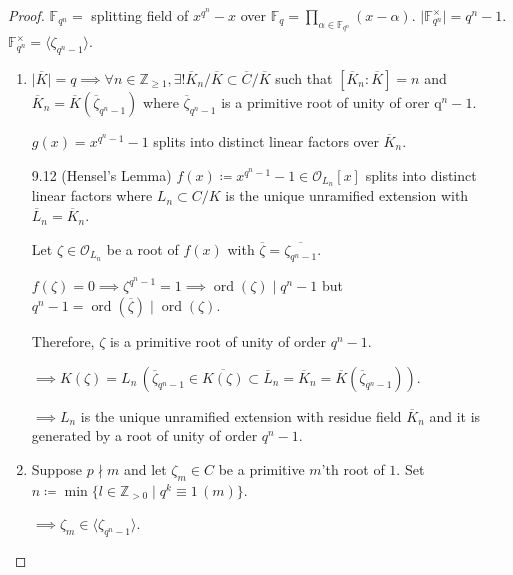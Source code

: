 \documentclass[openany]{amsbook}
\numberwithin{section}{chapter}
\theoremstyle{definition}
\begin{document}
\begin{proof}

    \(\mathbb{F}_{q^n} = \) splitting field of \(x^{q^n} - x\) over \(\mathbb{F}_q = \prod_{\alpha \in \mathbb{F}_{q^n}}(x-\alpha)\). \(\vert \mathbb{F}_{q^n}^\times \vert = q^n - 1\). \(\mathbb{F}_{q^n}^\times = \langle \zeta_{q^n - 1} \rangle\).   

    \begin{enumerate}[label=\roman*)]
        \item \(\vert \overline{K} \vert = q \implies \forall n\in\mathbb{Z}_{\geq 1}, \exists ! \overline{K}_n / \overline{K} \subset \overline{C} / \overline{K}\) such that \([\overline{K}_n : \overline{K}] = n\) and \(\overline{K}_n = \overline{K}(\overline{\zeta}_{q^n - 1})\) where \(\overline{\zeta}_{q^n - 1}\) is a primitive root of unity of orer q\(^n - 1\).
        
        \(g(x) = x^{q^n - 1} - 1\) splits into distinct linear factors over \(\overline{K}_n\).

        9.12 (Hensel's Lemma) \(f(x) \coloneqq x^{q^n - 1} - 1 \in \mathcal{O}_{L_n}[x]\) splits into distinct linear factors where \(L_n \subset C / K\) is the unique unramified extension with \(\overline{L}_n = \overline{K}_n\).

        Let \(\zeta \in \mathcal{O}_{L_n}   \) be a root of \(f(x)\) with \(\overline{\zeta} = \overline{\zeta_{q^n - 1}}\).
        
        \(f(\zeta) = 0 \implies\zeta^{q^n - 1} = 1 \implies \operatorname{ord}(\zeta) \mid q^n - 1\) but \(q^n - 1 = \operatorname{ord}(\overline{\zeta}) \mid \operatorname{ord}(\zeta)\).

        Therefore, \(\zeta\) is a primitive root of unity of order \(q^n - 1\).

        \(\implies K(\zeta) = L_n \,(\overline{\zeta}_{q^n - 1} \in \overline{K(\zeta)} \subset \overline{L}_n = \overline{K}_n = \overline{K}(\overline{\zeta}_{q^n - 1}))\).

        \(\implies L_n\) is the unique unramified extension with residue field \(\overline{K}_n\) and it is generated by a root of unity of order \(q^n - 1\). 

        \item Suppose \(p\nmid m\) and let \(\zeta_m \in C\) be a primitive \(m\)'th root of \(1\). Set \(n \coloneqq \min \{ l \in \mathbb{Z}_{> 0} \mid q^k\equiv 1 \,(m) \}\).
        
        \(\implies \zeta_m \in \langle \zeta_{q^n - 1} \rangle\).
        

\end{enumerate}
\end{proof}
\end{document}
